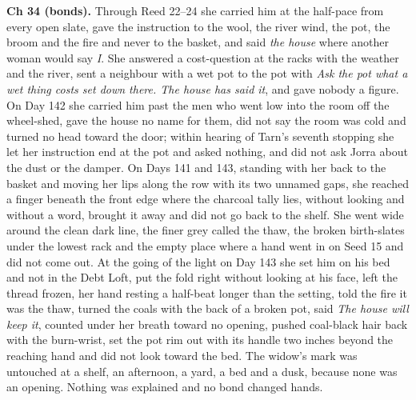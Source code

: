 \documentclass{design/chronicle}
\begin{document}
{\textbf{Ch 34 (bonds).} Through Reed 22–24 she carried him at the half-pace from every open slate, gave the instruction to the wool, the river wind, the pot, the broom and the fire and never to the basket, and said \emph{the house} where another woman would say \emph{I}. She answered a cost-question at the racks with the weather and the river, sent a neighbour with a wet pot to the pot with \emph{Ask the pot what a wet thing costs set down there. The house has said it}, and gave nobody a figure. On Day 142 she carried him past the men who went low into the room off the wheel-shed, gave the house no name for them, did not say the room was cold and turned no head toward the door; within hearing of Tarn’s seventh stopping she let her instruction end at the pot and asked nothing, and did not ask Jorra about the dust or the damper. On Days 141 and 143, standing with her back to the basket and moving her lips along the row with its two unnamed gaps, she reached a finger beneath the front edge where the charcoal tally lies, without looking and without a word, brought it away and did not go back to the shelf. She went wide around the clean dark line, the finer grey called the thaw, the broken birth-slates under the lowest rack and the empty place where a hand went in on Seed 15 and did not come out. At the going of the light on Day 143 she set him on his bed and not in the Debt Loft, put the fold right without looking at his face, left the thread frozen, her hand resting a half-beat longer than the setting, told the fire it was the thaw, turned the coals with the back of a broken pot, said \emph{The house will keep it}, counted under her breath toward no opening, pushed coal-black hair back with the burn-wrist, set the pot rim out with its handle two inches beyond the reaching hand and did not look toward the bed. The widow’s mark was untouched at a shelf, an afternoon, a yard, a bed and a dusk, because none was an opening. Nothing was explained and no bond changed hands.

}
\end{document}
